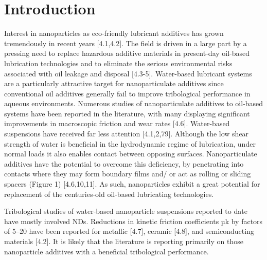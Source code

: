 \section{Introduction}


Interest in nanoparticles as eco-friendly lubricant additives has grown tremendously in recent years [4.1,4.2]. The field is driven in a large part by a pressing need to replace hazardous additive materials in present-day oil-based lubrication technologies and to eliminate the serious environmental risks associated with oil leakage and disposal [4.3-5]. Water-based lubricant systems are a particularly attractive target for nanoparticulate additives since conventional oil additives generally fail to improve tribological performance in aqueous environments. Numerous studies of nanoparticulate additives to oil-based systems have been reported in the literature, with many displaying significant improvements in macroscopic friction and wear rates [4.6]. Water-based suspensions have received far less attention [4.1,2,79]. Although the low shear strength of water is beneficial in the hydrodynamic regime of lubrication, under normal loads it also enables contact between opposing surfaces. Nanoparticulate additives have the potential to overcome this deficiency, by penetrating into contacts where they may form boundary films and/ or act as rolling or sliding spacers (Figure 1) [4.6,10,11]. As such, nanoparticles exhibit a great potential for replacement of the centuries-old oil-based lubricating technologies.

Tribological studies of water-based nanoparticle suspensions reported to date have mostly involved NDs. Reductions in kinetic friction coefficients µk by factors of 5–20 have been reported for metallic [4.7], ceramic [4.8], and semiconducting materials [4.2]. It is likely that the literature is reporting primarily on those nanoparticle additives with a beneficial tribological performance. 

